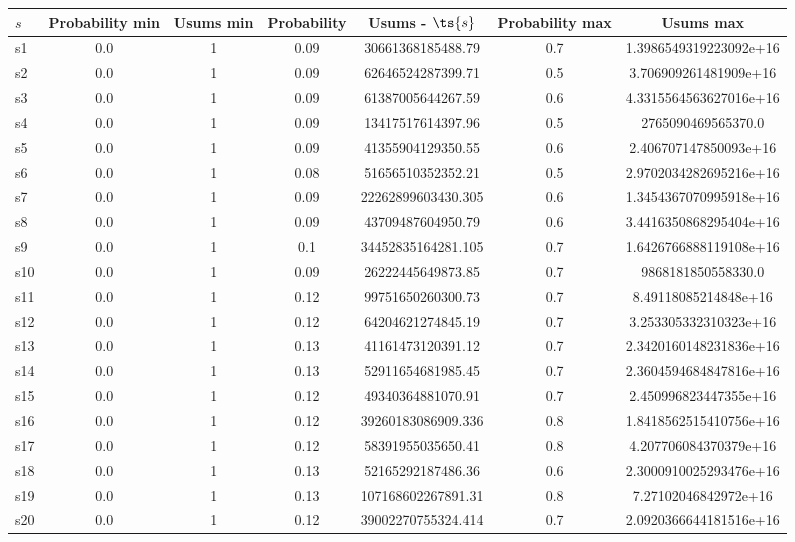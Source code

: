\documentclass{article}
\begin{document}
\noindent\begin{tabular}{|l|c|c|c|c|c|c|}
\hline
$s$& Probability min & Usums min & Probability & Usums - $\ts{s}$ & Probability max & Usums max\\
\hline
s1 &0.0 & 1 & 0.09 & 30661368185488.79 & 0.7 & 1.3986549319223092e+16\\
\hline
s2 &0.0 & 1 & 0.09 & 62646524287399.71 & 0.5 & 3.706909261481909e+16\\
\hline
s3 &0.0 & 1 & 0.09 & 61387005644267.59 & 0.6 & 4.3315564563627016e+16\\
\hline
s4 &0.0 & 1 & 0.09 & 13417517614397.96 & 0.5 & 2765090469565370.0\\
\hline
s5 &0.0 & 1 & 0.09 & 41355904129350.55 & 0.6 & 2.406707147850093e+16\\
\hline
s6 &0.0 & 1 & 0.08 & 51656510352352.21 & 0.5 & 2.9702034282695216e+16\\
\hline
s7 &0.0 & 1 & 0.09 & 22262899603430.305 & 0.6 & 1.3454367070995918e+16\\
\hline
s8 &0.0 & 1 & 0.09 & 43709487604950.79 & 0.6 & 3.4416350868295404e+16\\
\hline
s9 &0.0 & 1 & 0.1 & 34452835164281.105 & 0.7 & 1.6426766888119108e+16\\
\hline
s10 &0.0 & 1 & 0.09 & 26222445649873.85 & 0.7 & 9868181850558330.0\\
\hline
s11 &0.0 & 1 & 0.12 & 99751650260300.73 & 0.7 & 8.49118085214848e+16\\
\hline
s12 &0.0 & 1 & 0.12 & 64204621274845.19 & 0.7 & 3.253305332310323e+16\\
\hline
s13 &0.0 & 1 & 0.13 & 41161473120391.12 & 0.7 & 2.3420160148231836e+16\\
\hline
s14 &0.0 & 1 & 0.13 & 52911654681985.45 & 0.7 & 2.3604594684847816e+16\\
\hline
s15 &0.0 & 1 & 0.12 & 49340364881070.91 & 0.7 & 2.450996823447355e+16\\
\hline
s16 &0.0 & 1 & 0.12 & 39260183086909.336 & 0.8 & 1.8418562515410756e+16\\
\hline
s17 &0.0 & 1 & 0.12 & 58391955035650.41 & 0.8 & 4.207706084370379e+16\\
\hline
s18 &0.0 & 1 & 0.13 & 52165292187486.36 & 0.6 & 2.3000910025293476e+16\\
\hline
s19 &0.0 & 1 & 0.13 & 107168602267891.31 & 0.8 & 7.27102046842972e+16\\
\hline
s20 &0.0 & 1 & 0.12 & 39002270755324.414 & 0.7 & 2.0920366644181516e+16\\

\end{tabular}
\end{document}
